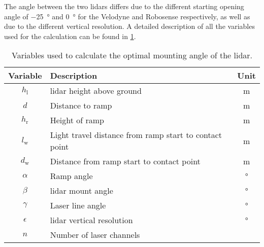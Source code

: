The angle between the two \glspl{lidar} differs due to the different starting opening angle of \SI{-25}{\degree} and \SI{0}{\degree} for the Velodyne and Robosense respectively, as well as due to the different vertical resolution.
A detailed description of all the variables used for the calculation can be found in \cref{tab:lidar_mount}.
\begin{table}[htbp]
	\centering
	\caption{Variables used to calculate the optimal mounting angle of the \gls{lidar}.}
	\label{tab:lidar_mount}
	\begin{tabular}[t]{clc}
		\toprule
		\textbf{Variable} & \textbf{Description}                                   & \textbf{Unit} \\
		\midrule
		$h_\mathrm{l} $   & \gls{lidar} height above ground                        & \si{\metre}   \\
		$d$               & Distance to ramp                                       & \si{\metre}   \\
		$h_\mathrm{r}$    & Height of ramp                                         & \si{\metre}   \\
		$l_\mathrm{w}$    & Light travel distance from ramp start to contact point & \si{\metre}   \\
		$d_\mathrm{w}$    & Distance from ramp start to contact point              & \si{\metre}   \\
		$\alpha$          & Ramp angle                                             & \si{\degree}  \\
		$\beta$           & \gls{lidar} mount angle                                & \si{\degree}  \\
		$\gamma$          & Laser line angle                                       & \si{\degree}  \\
		$\epsilon$        & \gls{lidar} vertical resolution                        & \si{\degree}  \\
		$n$               & Number of laser channels                               &               \\
		\bottomrule
	\end{tabular}
\end{table}


